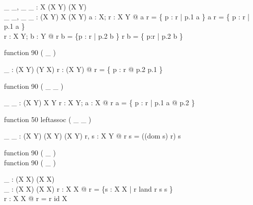 \begin{gendef}[X, Y]
  \_ \dres \_, \_ \ndres \_ : \power X \cross (X \rel Y) \fun (X \rel Y)\\
  \_ \rres \_, \_ \nrres \_ : (X \rel Y) \cross \power X \fun (X \rel Y)
\where
  \forall a : \power X; r : X \rel Y @ a \dres r = 
      \{ p : r | p.1 \in a \} \land a \ndres r = \{ p : r | p.1 \notin a \}\\
  \forall r : X \rel Y; b : \power Y @ r \rres b = \{p : r | p.2 \in b \} \land
      r \nrres b = \{ p:r | p.2 \notin b \}
\end{gendef}

\begin{zed}
  function 90 ( \_ \inv )
\end{zed}

\begin{gendef}[X, Y]
  \_ \inv : (X \rel Y) \fun (Y \rel X)
\where
  \forall r : (X \rel Y) @ r \inv = \{ p : r @ p.2 \mapsto p.1 \}
\end{gendef}

\begin{zed}
  function 90 ( \_ \limg \_ \rimg )
\end{zed}

\begin{gendef}[X, Y]
  \_ \limg \_ \rimg : (X \rel Y) \cross \power X \fun \power Y
\where
  \forall r : X \rel Y; a : \power X @ r \limg a \rimg = 
      \{ p : r | p.1 \in a @ p.2 \}
\end{gendef}

\begin{zed}
  function 50 leftassoc ( \_ \oplus \_ )
\end{zed}

\begin{gendef}[X, Y]
  \_ \oplus \_ : (X \rel Y) \cross (X \rel Y) \fun (X \rel Y)
\where
  \forall r, s : X \rel Y @ r \oplus s = ((dom s) \ndres r) \cup s
\end{gendef}

\begin{zed}
  function 90 ( \_ \plus )\\
  function 90 ( \_ \star )
\end{zed}

\begin{gendef}[X]
  \_ \plus : (X \rel X) \fun (X \rel X)\\
  \_ \star : (X \rel X) \fun (X \rel X)
\where
  \forall r : X \rel X @ r \plus = \bigcap \{s : X \rel X | r
  \subseteq land r \comp s \subseteq s \}\\
  \forall r : X \rel X @ r \star = r \plus \cup id X
\end{gendef}
